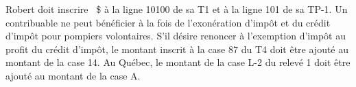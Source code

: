 Robert doit inscrire ~\$ à la ligne 10100 de sa T1 et à la ligne 101 de sa TP-1. Un contribuable ne peut bénéficier à la fois de l'exonération d'impôt et du crédit d'impôt pour pompiers volontaires. S'il désire renoncer à l'exemption d'impôt au profit du crédit d'impôt, le montant inscrit à la case 87 du T4 doit être ajouté au montant de la case 14. Au Québec, le montant de la case L-2 du relevé 1 doit être ajouté au montant de la case A.